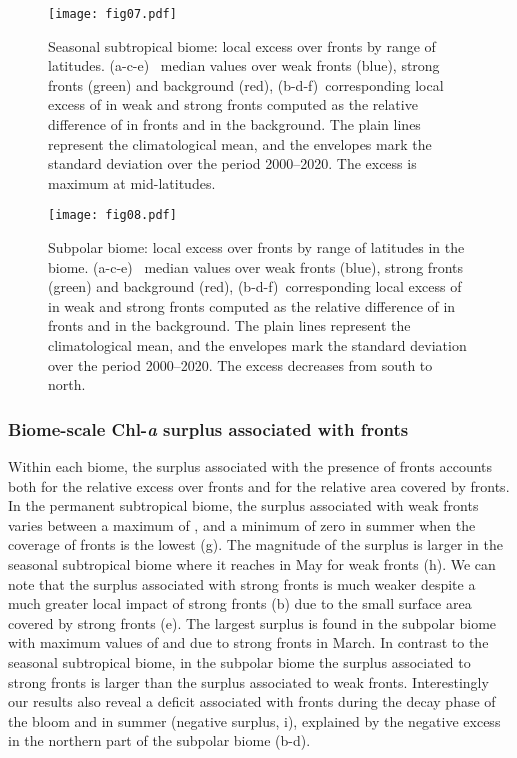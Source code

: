\begin{figure*}
  \centering
  \texttt{[image: fig07.pdf]}
  \caption[Local impact of front on Chl-\textit{a} in the seasonal subtropical biome]{
    Seasonal subtropical biome: local  excess over fronts by range of latitudes.
    (a-c-e)~ median values over weak fronts (blue), strong fronts (green) and background (red), (b-d-f)~corresponding local excess of  in weak and strong fronts computed as the relative difference of  in fronts and in the background.
    The plain lines represent the climatological mean, and the envelopes mark the standard deviation over the period 2000--2020.
    The excess is maximum at mid-latitudes.
  }%
  \label{fig:latbands-i}
\end{figure*}

\begin{figure*}
  \centering
  \texttt{[image: fig08.pdf]}
  \caption[Local impact of front on Chl-\textit{a} in the subpolar biome]{
    Subpolar biome: local  excess over fronts by range of latitudes in the biome.
    (a-c-e)~ median values over weak fronts (blue), strong fronts (green) and background (red), (b-d-f)~corresponding local excess of  in weak and strong fronts computed as the relative difference of  in fronts and in the background.
    The plain lines represent the climatological mean, and the envelopes mark the standard deviation over the period 2000--2020.
    The excess decreases from south to north.
  }%
  \label{fig:latbands-n}
\end{figure*}


\subsubsection{Biome-scale Chl-\textit{a} surplus associated with fronts}

Within each biome, the surplus  associated with the presence of fronts accounts both for the relative  excess over fronts and for the relative area covered by fronts.
In the permanent subtropical biome, the surplus associated with weak fronts varies between a maximum of , and a minimum of zero in summer when the coverage of fronts is the lowest (g).
The magnitude of the surplus is larger in the seasonal subtropical biome where it reaches  in May for weak fronts (h).
We can note that the surplus associated with strong fronts is much weaker despite a much greater local impact of strong fronts (b) due to the small surface area covered by strong fronts (e).
The largest surplus is found in the subpolar biome with maximum values of  and due to strong fronts in March.
In contrast to the seasonal subtropical biome, in the subpolar biome the surplus associated to strong fronts is larger than the surplus associated to weak fronts.
Interestingly our results also reveal a  deficit associated with fronts during the decay phase of the bloom and in summer (negative surplus, i), explained by the negative excess in the northern part of the subpolar biome (b-d).

